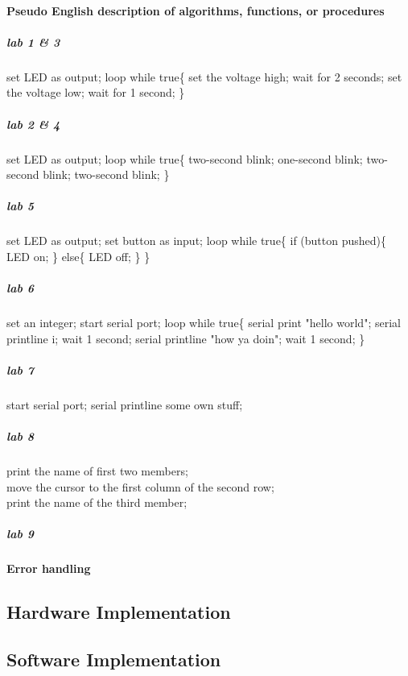 \paragraph{Pseudo English description of algorithms, functions, or procedures}
\subparagraph{lab 1 \& 3}
set LED as output;
loop while true\{
	set the voltage high;
	wait for 2 seconds;
	set the voltage low;
	wait for 1 second;
\}
\subparagraph{lab 2 \& 4}
set LED as output;
loop while true\{
	two-second blink;
	one-second blink;
	two-second blink;
	two-second blink;
\}
\subparagraph{lab 5}
set LED as output;
set button as input;
loop while true\{
	if (button pushed)\{
		LED on;
	\}
	else\{
		LED off;
	\}
\}
\subparagraph{lab 6}
set an integer;
start serial port;
loop while true\{
	serial print "hello world";
	serial printline i;
	wait 1 second;
	serial printline "how ya doin";
	wait 1 second;
\}
\subparagraph{lab 7}
start serial port;
serial printline some own stuff;
\subparagraph{lab 8}
print the name of first two members;\\
move the cursor to the first column of the second row;\\
print the name of the third member;
\subparagraph{lab 9}

\paragraph{Error handling}
\subsection{Hardware Implementation}
\subsection{Software Implementation}
